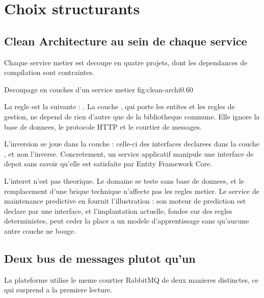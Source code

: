 \section{Choix structurants}
\label{sec:choix}

\subsection{Clean Architecture au sein de chaque service}

Chaque service metier est decoupe en quatre projets, dont les
dependances de compilation sont contraintes.

  {Decoupage en couches d'un service metier}
  {fig:clean-archi}{0.60}

La regle est la suivante : . La couche , qui porte les entites et les
regles de gestion, ne depend de rien d'autre que de la bibliotheque
commune. Elle ignore la base de donnees, le protocole HTTP et le
courtier de messages.

L'inversion se joue dans la couche  : celle-ci
 des interfaces declarees dans la couche
, et non l'inverse. Concretement, un service
applicatif manipule une interface de depot sans savoir qu'elle est
satisfaite par Entity Framework Core.

L'interet n'est pas theorique. Le domaine se teste sans base de donnees,
et le remplacement d'une brique technique n'affecte pas les regles
metier. Le service de maintenance predictive en fournit l'illustration :
son moteur de prediction est declare par une interface, et l'implantation
actuelle, fondee sur des regles deterministes, peut ceder la place a un
modele d'apprentissage sans qu'aucune autre couche ne bouge.

\subsection{Deux bus de messages plutot qu'un}

La plateforme utilise le meme courtier RabbitMQ de deux manieres
distinctes, ce qui surprend a la premiere lecture.

